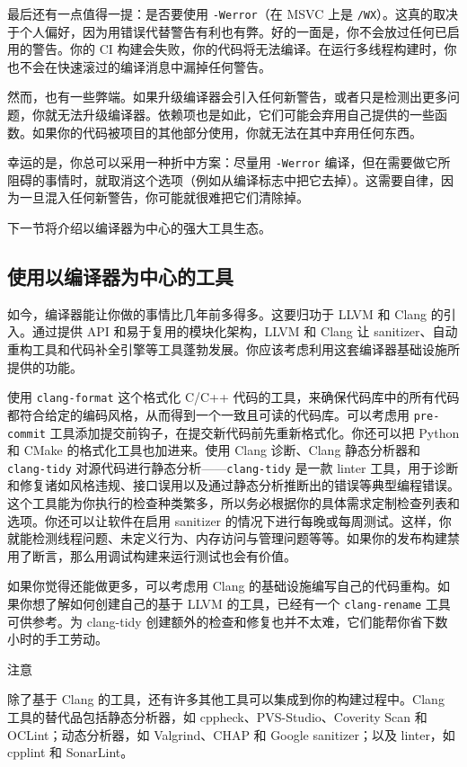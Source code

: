\label{idx:654}
最后还有一点值得一提：是否要使用 \texttt{-Werror}（在 MSVC 上是 \texttt{/WX}）。这真的取决于个人偏好，因为用错误代替警告有利也有弊。好的一面是，你不会放过任何已启用的警告。你的 CI 构建会失败，你的代码将无法编译。在运行多线程构建时，你也不会在快速滚过的编译消息中漏掉任何警告。

然而，也有一些弊端。如果升级编译器会引入任何新警告，或者只是检测出更多问题，你就无法升级编译器。依赖项也是如此，它们可能会弃用自己提供的一些函数。如果你的代码被项目的其他部分使用，你就无法在其中弃用任何东西。

幸运的是，你总可以采用一种折中方案：尽量用 \texttt{-Werror} 编译，但在需要做它所阻碍的事情时，就取消这个选项（例如从编译标志中把它去掉）。这需要自律，因为一旦混入任何新警告，你可能就很难把它们清除掉。

\label{idx:655}
下一节将介绍以编译器为中心的强大工具生态。

\subsection{使用以编译器为中心的工具}

\label{idx:656}
如今，编译器能让你做的事情比几年前多得多。这要归功于 LLVM 和 Clang 的引入。通过提供 API 和易于复用的模块化架构，LLVM 和 Clang 让 sanitizer、自动重构工具和代码补全引擎等工具蓬勃发展。你应该考虑利用这套编译器基础设施所提供的功能。

使用 \texttt{clang-format} 这个格式化 C/C++ 代码的工具，来确保代码库中的所有代码都符合给定的编码风格，从而得到一个一致且可读的代码库。可以考虑用 \texttt{pre-commit} 工具添加提交前钩子，在提交新代码前先重新格式化。你还可以把 Python 和 CMake 的格式化工具也加进来。使用 Clang 诊断、Clang 静态分析器和 \texttt{clang-tidy} 对源代码进行静态分析——\texttt{clang-tidy} 是一款 linter 工具，用于诊断和修复诸如风格违规、接口误用以及通过静态分析推断出的错误等典型编程错误。这个工具能为你执行的检查种类繁多，所以务必根据你的具体需求定制检查列表和选项。你还可以让软件在启用 sanitizer 的情况下进行每晚或每周测试。这样，你就能检测线程问题、未定义行为、内存访问与管理问题等等。如果你的发布构建禁用了断言，那么用调试构建来运行测试也会有价值。

如果你觉得还能做更多，可以考虑用 Clang 的基础设施编写自己的代码重构。如果你想了解如何创建自己的基于 LLVM 的工具，已经有一个 \texttt{clang-rename} 工具可供参考。为 clang-tidy 创建额外的检查和修复也并不太难，它们能帮你省下数小时的手工劳动。

\begin{myNotic}{注意}

除了基于 Clang 的工具，还有许多其他工具可以集成到你的构建过程中。Clang 工具的替代品包括静态分析器，如 cppheck、PVS-Studio、Coverity Scan 和 OCLint；动态分析器，如 Valgrind、CHAP 和 Google sanitizer；以及 linter，如 cpplint 和 SonarLint。
\end{myNotic}

